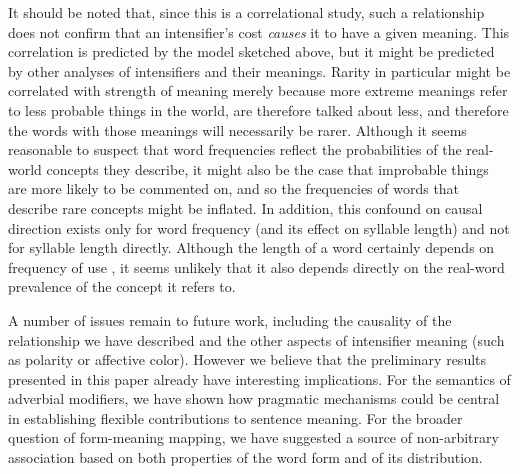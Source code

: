 \documentclass[10pt,letterpaper]{article}
\begin{document}
It should be noted that, since this is a correlational study, such a relationship does not confirm that an intensifier's cost \emph{causes} it to have a given meaning. This correlation is predicted by the model sketched above, but it might be predicted by other analyses of intensifiers and their meanings. Rarity in particular might be correlated with strength of meaning merely because more extreme meanings refer to less probable things in the world, are therefore talked about less, and therefore the words with those meanings will necessarily be rarer.
Although it seems reasonable to suspect that word frequencies reflect the probabilities of the real-world concepts they describe, it might also be the case that improbable things are more likely to be commented on, and so the frequencies of words that describe rare concepts might be inflated. In addition, this confound on causal direction exists only for word frequency (and its effect on syllable length) and not for syllable length directly.
Although the length of a word certainly depends on frequency of use%
, it seems unlikely that it also depends directly on the real-word prevalence of the concept it refers to.

A number of issues remain to future work, including the causality of the relationship we have described and the other aspects of intensifier meaning (such as polarity or affective color).
However we believe that the preliminary results presented in this paper already have interesting implications. 
For the semantics of adverbial modifiers, we have shown how pragmatic mechanisms could be central in establishing flexible contributions to sentence meaning.
For the broader question of form-meaning mapping, we have suggested a source of non-arbitrary association based on both properties of the word form and of its distribution.
\end{document}

